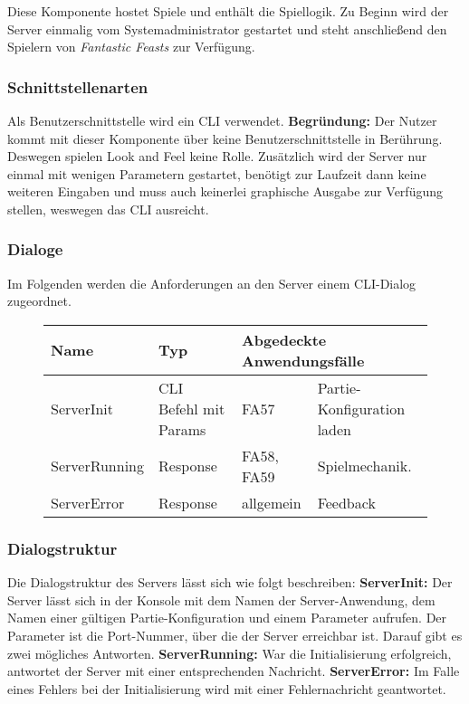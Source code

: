 Diese Komponente hostet Spiele und enthält die Spiellogik. Zu Beginn wird der Server einmalig vom Systemadministrator gestartet und steht anschließend den Spielern von \textit{Fantastic Feasts} zur Verfügung.

\subsubsection{Schnittstellenarten}
Als Benutzerschnittstelle wird ein CLI verwendet. \textbf{Begründung:} Der Nutzer kommt mit dieser Komponente über keine Benutzerschnittstelle in Berührung. Deswegen spielen Look and Feel keine Rolle. Zusätzlich wird der Server nur einmal mit wenigen Parametern gestartet, benötigt zur Laufzeit dann keine weiteren Eingaben und muss auch keinerlei graphische Ausgabe zur Verfügung stellen, weswegen das CLI ausreicht.

\subsubsection{Dialoge}
Im Folgenden werden die Anforderungen an den Server einem CLI-Dialog zugeordnet.

\begin{figure}[H]
    \centering
    \begin{tabular}{| l l l l |}
    \hline
    \textbf{Name} & \textbf{Typ} & \multicolumn{2}{l|}{\textbf{Abgedeckte Anwendungsfälle}} \\\hline
    ServerInit & CLI Befehl mit Params & FA57 & Partie-Konfiguration laden\\\hline
    ServerRunning & Response & FA58, FA59 & Spielmechanik.\\\hline
    ServerError & Response & allgemein & Feedback\\\hline
    
    \end{tabular}
\end{figure}

\subsubsection{Dialogstruktur}  
Die Dialogstruktur des Servers lässt sich wie folgt beschreiben: \textbf{ServerInit:} Der Server lässt sich in der Konsole mit dem Namen der Server-Anwendung, dem Namen einer gültigen Partie-Konfiguration und einem Parameter aufrufen. Der Parameter ist die Port-Nummer, über die der Server erreichbar ist. Darauf gibt es zwei mögliches Antworten. \textbf{ServerRunning:} War die Initialisierung erfolgreich, antwortet der Server mit einer entsprechenden Nachricht. \textbf{ServerError:} Im Falle eines Fehlers bei der Initialisierung wird mit einer Fehlernachricht geantwortet.

